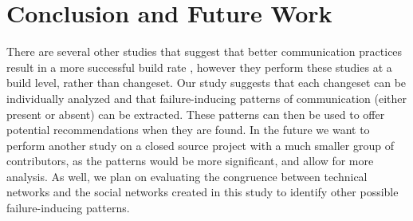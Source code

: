 \documentclass[conference]{IEEEtran}
\begin{document}
\section{Conclusion and Future Work}
There are several other studies that suggest that better communication practices result in a more successful build rate \cite{Wolf:2009:PBF:1555001.1555017}\cite{Schroter:2010:PBO:1810295.1810456}\cite{4721184}\cite{Zimmermann:2008:PDU:1368088.1368161}, however they perform these studies at a build level, rather than changeset.  Our study suggests that each changeset can be individually analyzed and that failure-inducing patterns of communication (either present or absent) can be extracted.  These patterns can then be used to offer potential recommendations when they are found.  In the future we want to perform another study on a closed source project with a much smaller group of contributors, as the patterns would be more significant, and allow for more analysis. As well, we plan on evaluating the congruence between technical networks and the social networks created in this study to identify other possible failure-inducing patterns. 




\end{document}
